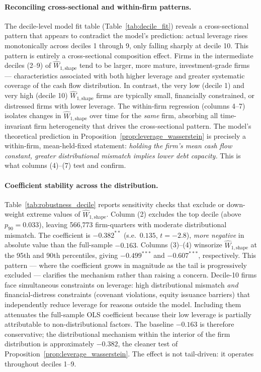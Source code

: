 \paragraph{Reconciling cross-sectional and within-firm patterns.}
The decile-level model fit table (Table~\ref{tab:decile_fit}) reveals a cross-sectional pattern that appears to contradict the model's prediction: actual leverage rises monotonically across deciles 1 through 9, only falling sharply at decile 10. This pattern is entirely a cross-sectional composition effect. Firms in the intermediate deciles (2--9) of $\widehat{W}_{1,\text{shape}}$ tend to be larger, more mature, investment-grade firms — characteristics associated with both higher leverage and greater systematic coverage of the cash flow distribution. In contrast, the very low (decile 1) and very high (decile 10) $\widehat{W}_{1,\text{shape}}$ firms are typically small, financially constrained, or distressed firms with lower leverage. The within-firm regression (columns 4--7) isolates changes in $\widehat{W}_{1,\text{shape}}$ over time for the \emph{same} firm, absorbing all time-invariant firm heterogeneity that drives the cross-sectional pattern. The model's theoretical prediction in Proposition~\ref{prop:leverage_wasserstein} is precisely a within-firm, mean-held-fixed statement: \emph{holding the firm's mean cash flow constant, greater distributional mismatch implies lower debt capacity.} This is what columns (4)--(7) test and confirm.

\paragraph{Coefficient stability across the distribution.}
Table~\ref{tab:robustness_decile} reports sensitivity checks that exclude or down-weight extreme values of $\widehat{W}_{1,\text{shape}}$. Column (2) excludes the top decile (above $p_{90} = 0.033$), leaving 566,773 firm-quarters with moderate distributional mismatch. The coefficient is $-0.382^{**}$ (s.e.\ $0.135$, $t = -2.8$), \emph{more negative} in absolute value than the full-sample $-0.163$. Columns (3)--(4) winsorize $\widehat{W}_{1,\text{shape}}$ at the 95th and 90th percentiles, giving $-0.499^{***}$ and $-0.607^{***}$, respectively. This pattern --- where the coefficient grows in magnitude as the tail is progressively excluded --- clarifies the mechanism rather than raising a concern. Decile-10 firms face simultaneous constraints on leverage: high distributional mismatch \emph{and} financial-distress constraints (covenant violations, equity issuance barriers) that independently reduce leverage for reasons outside the model. Including them attenuates the full-sample OLS coefficient because their low leverage is partially attributable to non-distributional factors. The baseline $-0.163$ is therefore conservative; the distributional mechanism within the interior of the firm distribution is approximately $-0.382$, the cleaner test of Proposition~\ref{prop:leverage_wasserstein}. The effect is not tail-driven: it operates throughout deciles 1--9.

